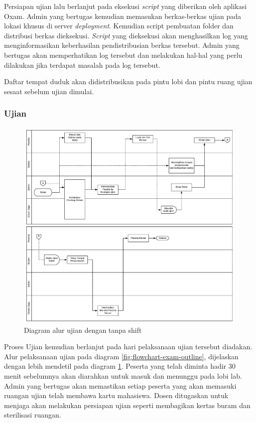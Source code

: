         Persiapan ujian lalu berlanjut pada eksekusi \textit{script} yang
        diberikan oleh aplikasi Oxam. Admin yang bertugas kemudian memasukan
        berkas-berkas ujian pada lokasi khusus di server \textit{deployment}.
        Kemudian script pembuatan folder dan distribusi berkas dieksekusi.
        \textit{Script} yang dieksekusi akan menghasilkan log yang
        menginformasikan keberhasilan pendistribusian berkas tersebut. Admin
        yang bertugas akan memperhatikan log tersebut dan melakukan hal-hal yang
        perlu dilakukan jika terdapat masalah pada log tersebut.
        
        Daftar tempat duduk akan didistribusikan pada pintu lobi dan pintu ruang
        ujian sesaat sebelum ujian dimulai.
    
    \subsubsection{Ujian}
        \begin{figure}
            \centering
            \includegraphics[width=0.75\paperwidth]{Gambar/flowchart/exam-flow-ujian-no-shift.pdf}
            \caption{Diagram alur ujian dengan tanpa shift}
            \label{fig:flowchart-exam-exam-noshift}
        \end{figure}
        Proses Ujian kemudian berlanjut pada hari pelaksanaan ujian tersebut
        diadakan. Alur pelaksanaan ujian pada diagram
        \ref{fig:flowchart-exam-outline}, dijelaskan dengan lebih mendetil pada
        diagram \ref{fig:flowchart-exam-exam-noshift}. Peserta yang telah
        diminta hadir 30 menit sebelumnya akan diarahkan untuk masuk dan
        menunggu pada lobi lab. Admin yang bertugas akan memastikan setiap
        peserta yang akan memasuki ruangan ujian telah membawa kartu mahasiswa.
        Dosen ditugaskan untuk menjaga akan melakukan persiapan ujian seperti
        membagikan kertas buram dan sterilisasi ruangan.
        
